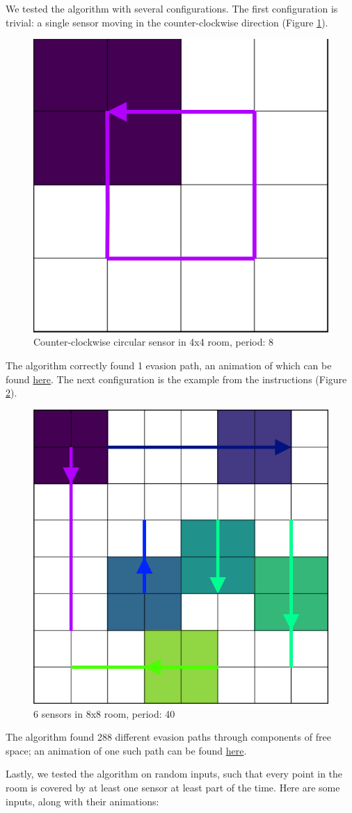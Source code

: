 \documentclass{article}
\begin{document}
We tested the algorithm with several configurations.
The first configuration is trivial: a single sensor moving in the counter-clockwise direction (Figure \ref{fig:ccw}).
\begin{figure}[H]
  \centering
  \includegraphics[width=0.3\linewidth]{ccw.png}
  \caption{Counter-clockwise circular sensor in 4x4 room, period: 8}
  \label{fig:ccw}
\end{figure}

The algorithm correctly found 1 evasion path, an animation of which can be found \href{https://github.com/MOj0/TDA_Evasion/blob/main/gifs/ccw.gif}{here}.
The next configuration is the example from the instructions (Figure \ref{fig:example}).
\begin{figure}[H]
  \centering
  \includegraphics[width=0.6\linewidth]{example.png}
  \caption{6 sensors in 8x8 room, period: 40}
  \label{fig:example}
\end{figure}

The algorithm found 288 different evasion paths through components of free space; an animation of one such path can be found \href{https://github.com/MOj0/TDA_Evasion/blob/main/gifs/example.gif}{here}.

\bigskip

Lastly, we tested the algorithm on random inputs, such that every point in the room is covered by at least one sensor at least part of the time.
Here are some inputs, along with their animations:
\end{document}
